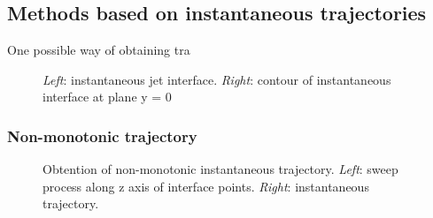 \subsection{Methods based on instantaneous trajectories}

One possible way of obtaining tra

\begin{figure}[ht]
     \centering
     \begin{subfigure}[b]{0.45\textwidth}
         \centering
     \end{subfigure}
     \begin{subfigure}[b]{0.45\textwidth}
         \centering
     \end{subfigure}
        \caption{\textsl{Left}: instantaneous jet interface. \textsl{Right}: contour of instantaneous interface at plane y = 0}
        \label{fig:trajectory_obtention_instantaneous_general}
\end{figure}


\subsubsection*{Non-monotonic trajectory}


\begin{figure}[ht]
     \centering
     \begin{subfigure}[b]{0.45\textwidth}
         \centering
     \end{subfigure}
     \begin{subfigure}[b]{0.45\textwidth}
         \centering
     \end{subfigure}
        \caption{Obtention of non-monotonic instantaneous trajectory. \textsl{Left}: sweep process along z axis of interface points. \textsl{Right}: instantaneous trajectory.}
        \label{fig:trajectory_obtention_instantaneous_method_a}
\end{figure}



